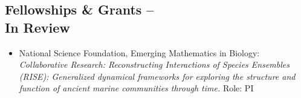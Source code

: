 \documentclass[margin,line,12pt]{res}
\newenvironment{list2}{
  \begin{list}{$\bullet$}{%
      \setlength{\itemsep}{0in}
      \setlength{\parsep}{0in} \setlength{\parskip}{0in}
      \setlength{\topsep}{0in} \setlength{\partopsep}{0in}
      \setlength{\leftmargin}{0.2in}}}{\end{list}}
\begin{document}
\begin{resume}
%
%
%




\section{\sc Fellowships \& Grants -- \\  In Review}
\begin{itemize}
\item National Science Foundation, Emerging Mathematics in Biology: \emph{Collaborative Research: Reconstructing Interactions of Species Ensembles (RISE): Generalized dynamical frameworks for exploring the structure and function of ancient marine communities through time.} Role: PI



\end{itemize}
\end{resume}
\end{document}
